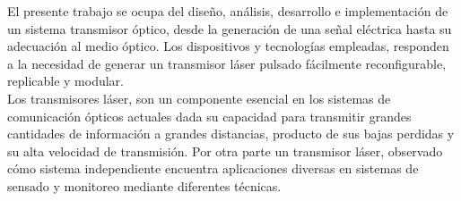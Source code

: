 


\begin{abstracts}        %

    El presente trabajo se ocupa del diseño, análisis, desarrollo e implementación de un sistema transmisor óptico, desde la generación de una señal eléctrica hasta su adecuación al medio óptico.
    Los dispositivos y tecnologías empleadas, responden a la necesidad de generar un transmisor láser pulsado
    fácilmente reconfigurable, replicable y modular.\\
    
    \noindent Los transmisores láser, son un componente esencial en los sistemas de comunicación ópticos actuales dada su capacidad
    para transmitir grandes cantidades de información a grandes distancias, producto de sus bajas perdidas y su alta velocidad de transmisión.
    Por otra parte un transmisor láser, observado cómo sistema independiente encuentra aplicaciones diversas en sistemas de sensado y monitoreo mediante diferentes técnicas.






    
    

\end{abstracts}


